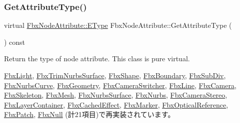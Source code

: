 \subsubsection{\texorpdfstring{Get\+Attribute\+Type()}{GetAttributeType()}}
{\footnotesize\ttfamily virtual \hyperlink{class_fbx_node_attribute_a08e1669d3d1a696910756ab17de56d6a}{Fbx\+Node\+Attribute\+::\+E\+Type} Fbx\+Node\+Attribute\+::\+Get\+Attribute\+Type (\begin{DoxyParamCaption}{ }\end{DoxyParamCaption}) const\hspace{0.3cm}{\ttfamily [virtual]}}

Return the type of node attribute. This class is pure virtual. 

\hyperlink{class_fbx_light_a0a0ef9dd3eacb2cadb30416d13ea8e7d}{Fbx\+Light}, \hyperlink{class_fbx_trim_nurbs_surface_a2d60f9613978db561ac32e2efff35104}{Fbx\+Trim\+Nurbs\+Surface}, \hyperlink{class_fbx_shape_a976141cda408244bd89c44c7a6b22d4b}{Fbx\+Shape}, \hyperlink{class_fbx_boundary_a093be9c6c0c0f13a337e9b6815aed9d0}{Fbx\+Boundary}, \hyperlink{class_fbx_sub_div_ac109cef6a177563eab80e28d414289a3}{Fbx\+Sub\+Div}, \hyperlink{class_fbx_nurbs_curve_aa6ec087af306c42ac814d43ea80c60b3}{Fbx\+Nurbs\+Curve}, \hyperlink{class_fbx_geometry_a41ae23e5d0cf08693bca49737f333de9}{Fbx\+Geometry}, \hyperlink{class_fbx_camera_switcher_ad42aacc90ece1f0295e51db102ae48ad}{Fbx\+Camera\+Switcher}, \hyperlink{class_fbx_line_a3307097464d924b2c95c6687e41d69c9}{Fbx\+Line}, \hyperlink{class_fbx_camera_a1149e4b05fd079637fe8d2a66a5a7a17}{Fbx\+Camera}, \hyperlink{class_fbx_skeleton_a3ff6cd0cae408860585d954b7249a4d9}{Fbx\+Skeleton}, \hyperlink{class_fbx_mesh_a5a52e41ccf1382c40d3361ec3cfbb68a}{Fbx\+Mesh}, \hyperlink{class_fbx_nurbs_surface_a7c075984ec95a01b9cb6031e19cbd0cf}{Fbx\+Nurbs\+Surface}, \hyperlink{class_fbx_nurbs_a6c810e3a50538b346cbbf61338dca907}{Fbx\+Nurbs}, \hyperlink{class_fbx_camera_stereo_a19160f0fdeaf5407d2bc9c1608f6af53}{Fbx\+Camera\+Stereo}, \hyperlink{class_fbx_layer_container_a578a24bfcd49464813a4b5b08a12ec59}{Fbx\+Layer\+Container}, \hyperlink{class_fbx_cached_effect_a4c904f4208d8e9f3ddbb49240475b6cc}{Fbx\+Cached\+Effect}, \hyperlink{class_fbx_marker_a46b62e421142c41e188a62ab3963493c}{Fbx\+Marker}, \hyperlink{class_fbx_optical_reference_ac2c1840cbfffb236bd3b9fe49d797e12}{Fbx\+Optical\+Reference}, \hyperlink{class_fbx_patch_a4eb7de708949e012e0dcae2cb87a2ef4}{Fbx\+Patch}, \hyperlink{class_fbx_null_a16b32e758ed2fe821e2c895526b71925}{Fbx\+Null} (計21項目)で再実装されています。


